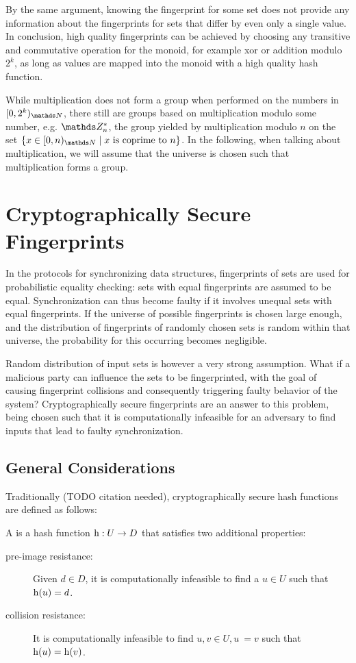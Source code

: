 By the same argument, knowing the fingerprint for some set does not provide any information about the fingerprints for sets that differ by even only a single value. In conclusion, high quality fingerprints can be achieved by choosing any transitive and commutative operation for the monoid, for example xor or addition modulo $2^k$, as long as values are mapped into the monoid with a high quality hash function.

While multiplication does not form a group when performed on the numbers in $\interval{0}{2^k}{\N}$, there still are groups based on multiplication modulo some number, e.g. $\Z_n^\ast$, the group yielded by multiplication modulo $n$ on the set $\set{x \in \interval{0}{n}{\N} \mid \text{$x$ is coprime to $n$}}$. In the following, when talking about multiplication, we will assume that the universe is chosen such that multiplication forms a group.

\section{Cryptographically Secure Fingerprints}
\label{crypto}

In the protocols for synchronizing data structures, fingerprints of sets are used for probabilistic equality checking: sets with equal fingerprints are assumed to be equal. Synchronization can thus become faulty if it involves unequal sets with equal fingerprints. If the universe of possible fingerprints is chosen large enough, and the distribution of fingerprints of randomly chosen sets is random within that universe, the probability for this occurring becomes negligible.

Random distribution of input sets is however a very strong assumption. What if a malicious party can influence the sets to be fingerprinted, with the goal of causing fingerprint collisions and consequently triggering faulty behavior of the system? Cryptographically secure fingerprints are an answer to this problem, being chosen such that it is computationally infeasible for an adversary to find inputs that lead to faulty synchronization.

\subsection{General Considerations}

Traditionally (TODO citation needed), cryptographically secure hash functions are defined as follows:

\begin{definition}
A  is a hash function ${\operatorname{h}}: {U} \rightarrow {D}$ that satisfies two additional properties:

\begin{description}
  \item[pre-image resistance:] Given $d \in D$, it is computationally infeasible to find a $u \in U$ such that $\operatorname{h}(u) = d$.
  \item[collision resistance:] It is computationally infeasible to find $u, v \in U, u ~= v$ such that $\operatorname{h}(u) = \operatorname{h}(v)$.
\end{description}
\end{definition}

